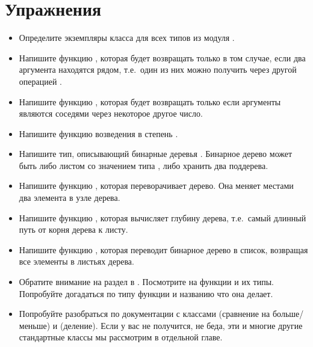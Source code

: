 \section{Упражнения}

\begin{itemize}

\item Определите экземпляры класса  для всех типов из
        модуля .

\item Напишите функцию , которая
        будет возвращать  только в том случае, если
        два аргумента находятся рядом, т.е.~один из них можно
        получить через другой операцией .

\item Напишите функцию , которая
        будет возвращать  только если аргументы
        являются соседями через некоторое другое число. 

\item Напишите функцию возведения в степень .

\item Напишите тип, описывающий бинарные деревья . 
        Бинарное дерево может быть либо листом со значением типа ,
        либо хранить два поддерева.

\item Напишите функцию ,
        которая переворачивает дерево. Она меняет местами два элемента
        в узле дерева.

\item Напишите функцию , которая
        вычисляет глубину дерева, т.е.~самый длинный путь от корня дерева
        к листу.

\item Напишите функцию , которая
        переводит бинарное дерево в список, возвращая все элементы
        в листьях дерева.  

\item Обратите внимание на раздел  в . 
        Посмотрите на функции и их типы. Попробуйте догадаться
        по типу функции и названию что она делает.

\item Попробуйте разобраться по документации с классами 
        (сравнение на больше/меньше) и  (деление).
        Если у вас не получится, не беда, эти и многие другие
        стандартные классы мы рассмотрим в отдельной главе.

\end{itemize}
